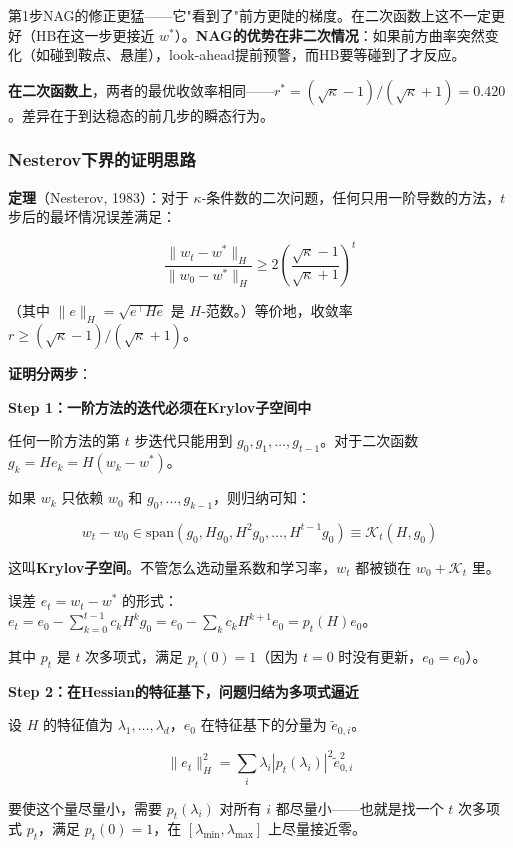 \documentclass[12pt,a4paper]{article}
\begin{document}
第1步NAG的修正更猛——它"看到了"前方更陡的梯度。在二次函数上这不一定更好（HB在这一步更接近 $w^*$）。\textbf{NAG的优势在非二次情况}：如果前方曲率突然变化（如碰到鞍点、悬崖），look-ahead提前预警，而HB要等碰到了才反应。

\textbf{在二次函数上}，两者的最优收敛率相同——$r^* = (\sqrt\kappa-1)/(\sqrt\kappa+1) = 0.420$。差异在于到达稳态的前几步的瞬态行为。


\subsubsection{Nesterov下界的证明思路}

\textbf{定理}（Nesterov, 1983）：对于 $\kappa$-条件数的二次问题，任何只用一阶导数的方法，$t$ 步后的最坏情况误差满足：


\[\frac{\|w_t - w^*\|_H}{\|w_0 - w^*\|_H} \ge 2\left(\frac{\sqrt\kappa - 1}{\sqrt\kappa + 1}\right)^t\]

（其中 $\|e\|_H = \sqrt{e^\top H e}$ 是 $H$-范数。）等价地，收敛率 $r \ge (\sqrt\kappa-1)/(\sqrt\kappa+1)$。

\textbf{证明分两步}：

\textbf{Step 1：一阶方法的迭代必须在Krylov子空间中}

任何一阶方法的第 $t$ 步迭代只能用到 $g_0, g_1, \ldots, g_{t-1}$。对于二次函数 $g_k = He_k = H(w_k - w^*)$。

如果 $w_k$ 只依赖 $w_0$ 和 $g_0, \ldots, g_{k-1}$，则归纳可知：


\[w_t - w_0 \in \text{span}(g_0, Hg_0, H^2g_0, \ldots, H^{t-1}g_0) \equiv \mathcal{K}_t(H, g_0)\]

这叫\textbf{Krylov子空间}。不管怎么选动量系数和学习率，$w_t$ 都被锁在 $w_0 + \mathcal{K}_t$ 里。

误差 $e_t = w_t - w^*$ 的形式：$e_t = e_0 - \sum_{k=0}^{t-1} c_k H^k g_0 = e_0 - \sum_k c_k H^{k+1} e_0 = p_t(H) e_0$。

其中 $p_t$ 是 $t$ 次多项式，满足 $p_t(0) = 1$（因为 $t=0$ 时没有更新，$e_0 = e_0$）。

\textbf{Step 2：在Hessian的特征基下，问题归结为多项式逼近}

设 $H$ 的特征值为 $\lambda_1, \ldots, \lambda_d$，$e_0$ 在特征基下的分量为 $\tilde{e}_{0,i}$。


\[\|e_t\|_H^2 = \sum_i \lambda_i |p_t(\lambda_i)|^2 \tilde{e}_{0,i}^2\]

要使这个量尽量小，需要 $p_t(\lambda_i)$ 对所有 $i$ 都尽量小——也就是找一个 $t$ 次多项式 $p_t$，满足 $p_t(0) = 1$，在 $[\lambda_{\min}, \lambda_{\max}]$ 上尽量接近零。
\end{document}
